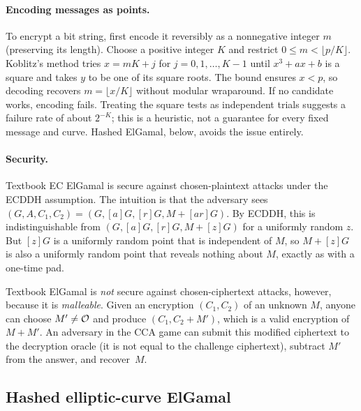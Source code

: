 \paragraph{Encoding messages as points.}
To encrypt a bit string, first encode it reversibly as a nonnegative
integer $m$ (preserving its length). Choose a positive integer $K$ and
restrict $0 \le m < \lfloor p/K \rfloor$.
Koblitz's method\autocite{Koblitz87} tries $x = mK + j$ for
$j = 0, 1, \dots, K-1$ until $x^3 + ax + b$ is a square and takes $y$ to be
one of its square roots. The bound ensures $x < p$, so decoding recovers
$m = \lfloor x/K \rfloor$ without modular wraparound.
If no candidate works, encoding fails. Treating the square tests as
independent trials suggests a failure rate of about $2^{-K}$; this is a
heuristic, not a guarantee for every fixed message and curve.
Hashed ElGamal, below, avoids the issue entirely.

\paragraph{Security.}
Textbook EC ElGamal is secure against chosen-plaintext attacks under the
ECDDH assumption.
The intuition is that the adversary sees $(G, A, C_1, C_2) =
(G, [a]G, [r]G, M + [ar]G)$.
By ECDDH, this is indistinguishable from $(G, [a]G, [r]G, M + [z]G)$ for
a uniformly random $z$.
But $[z]G$ is a uniformly random point that is independent of $M$, so
$M + [z]G$ is also a uniformly random point that reveals nothing about
$M$, exactly as with a one-time pad.

Textbook ElGamal is \emph{not} secure against chosen-ciphertext attacks,
however, because it is \emph{malleable}.
Given an encryption $(C_1, C_2)$ of an unknown $M$, anyone can choose
$M' \neq \mathcal{O}$ and produce $(C_1, C_2 + M')$, which is a valid encryption
of $M + M'$.
An adversary in the CCA game can submit this modified ciphertext to the
decryption oracle (it is not equal to the challenge ciphertext), subtract
$M'$ from the answer, and recover~$M$.

\subsection{Hashed elliptic-curve ElGamal}

